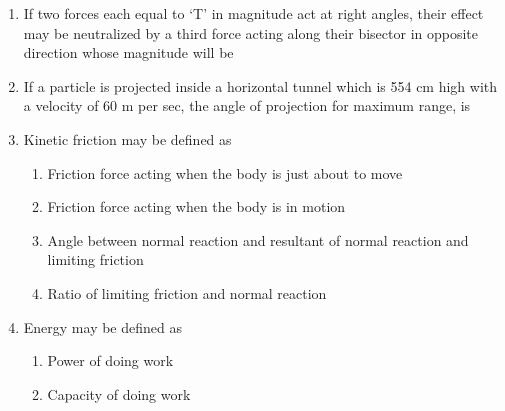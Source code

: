 \documentclass[11pt,a4paper]{article}
\begin{document}
\begin{enumerate}
{}
\\
\item{If two forces each equal to `T' in magnitude act at right angles, their effect may be neutralized by a third force acting along their bisector in opposite direction whose magnitude will be
}
\\
\item{If a particle is projected inside a horizontal tunnel which is 554 cm high with a velocity of 60 m per sec, the angle of projection for maximum range, is}
\\
\item{Kinetic friction may be defined as}
\begin{enumerate}[label=\Alph*.]
\item{Friction force acting when the body is just about to move}
\item{Friction force acting when the body is in motion}
\item{Angle between normal reaction and resultant of normal reaction and limiting friction}
\item{Ratio of limiting friction and normal reaction}
\end{enumerate}
\item{Energy may be defined as}
\begin{enumerate}[label=\Alph*.]
\item{Power of doing work}
\item{Capacity of doing work}

\end{enumerate}
\end{enumerate}
\end{document}
